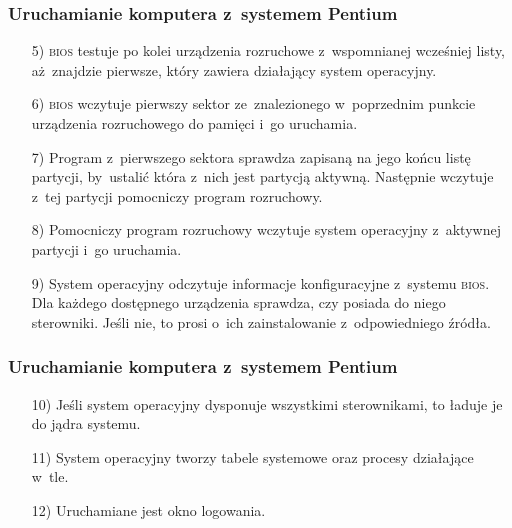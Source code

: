 \documentclass[10pt,t]{beamer}
\begin{document}
\begin{frame}
  \frametitle{Uruchamianie komputera z~systemem Pentium}


  \begin{itemize}

  \item[5)] \textsc{bios} testuje po kolei urządzenia rozruchowe
    z~wspomnianej wcześniej listy, aż~znajdzie pierwsze, który zawiera
    działający system operacyjny.

  \item[6)] \textsc{bios} wczytuje pierwszy sektor ze~znalezionego
    w~poprzednim punkcie urządzenia rozruchowego do pamięci i~go uruchamia.

  \item[7)] Program z~pierwszego sektora sprawdza zapisaną na jego końcu
    listę partycji, by~ustalić która z~nich jest partycją aktywną.
    Następnie wczytuje z~tej partycji pomocniczy program rozruchowy.

  \item[8)] Pomocniczy program rozruchowy wczytuje system operacyjny
    z~aktywnej partycji i~go uruchamia.

  \item[9)] System operacyjny odczytuje informacje konfiguracyjne z~systemu
    \textsc{bios}. Dla każdego dostępnego urządzenia sprawdza, czy posiada
    do niego sterowniki. Jeśli nie, to prosi o~ich zainstalowanie
    z~odpowiedniego źródła.

  \end{itemize}

\end{frame}





\begin{frame}
  \frametitle{Uruchamianie komputera z~systemem Pentium}


  \begin{itemize}

  \item[10)] Jeśli system operacyjny dysponuje wszystkimi sterownikami,
    to ładuje je do jądra systemu.

  \item[11)] System operacyjny tworzy tabele systemowe oraz procesy
    działające w~tle.

  \item[12)] Uruchamiane jest okno logowania.

  \end{itemize}

\end{frame}
\end{document}
